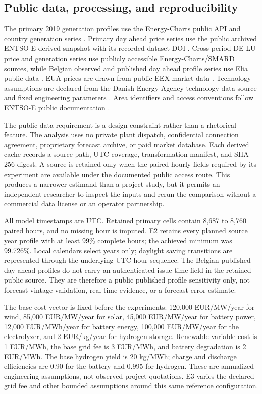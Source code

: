 \documentclass[largeformat]{interact}
\begin{document}
\subsection{Public data, processing, and
reproducibility}\label{public-data-processing-and-reproducibility}

The primary 2019 generation profiles use the Energy-Charts public API
and country generation series \citep{ref39,ref44}. Primary day ahead
price series use the public archived ENTSO-E-derived snapshot with its
recorded dataset DOI \citep{ref45}. Cross period DE-LU price and
generation series use publicly accessible Energy-Charts/SMARD sources,
while Belgian observed and published day ahead profile series use Elia
public data \citep{ref40,ref41}. EUA prices are drawn from public EEX
market data \citep{ref34}. Technology assumptions are declared from the
Danish Energy Agency technology data source and fixed engineering
parameters \citep{ref35}. Area identifiers and access conventions follow
ENTSO-E public documentation \citep{ref27,ref28}.

The public data requirement is a design constraint rather than a
rhetorical feature. The analysis uses no private plant dispatch,
confidential connection agreement, proprietary forecast archive, or paid
market database. Each derived cache records a source path, UTC coverage,
transformation manifest, and SHA-256 digest. A source is retained only
when the paired hourly fields required by its experiment are available
under the documented public access route. This produces a narrower
estimand than a project study, but it permits an independent researcher
to inspect the inputs and rerun the comparison without a commercial data
license or an operator partnership.

All model timestamps are UTC. Retained primary cells contain 8,687 to
8,760 paired hours, and no missing hour is imputed. E2 retains every
planned source year profile with at least 99\% complete hours; the
achieved minimum was 99.726\%. Local calendars select years only;
daylight saving transitions are represented through the underlying UTC
hour sequence. The Belgian published day ahead profiles do not carry an
authenticated issue time field in the retained public source. They are
therefore a public published profile sensitivity only, not forecast
vintage validation, real time evidence, or a forecast error estimate.

The base cost vector is fixed before the experiments: 120,000
EUR/MW/year for wind, 85,000 EUR/MW/year for solar, 45,000 EUR/MW/year
for battery power, 12,000 EUR/MWh/year for battery energy, 100,000
EUR/MW/year for the electrolyzer, and 2 EUR/kg/year for hydrogen
storage. Renewable variable cost is 1 EUR/MWh, the base grid fee is 3
EUR/MWh, and battery degradation is 2 EUR/MWh. The base hydrogen yield
is 20 kg/MWh; charge and discharge efficiencies are 0.90 for the battery
and 0.995 for hydrogen. These are annualized engineering assumptions,
not observed project quotations. E3 varies the declared grid fee and
other bounded assumptions around this same reference configuration.
\end{document}
